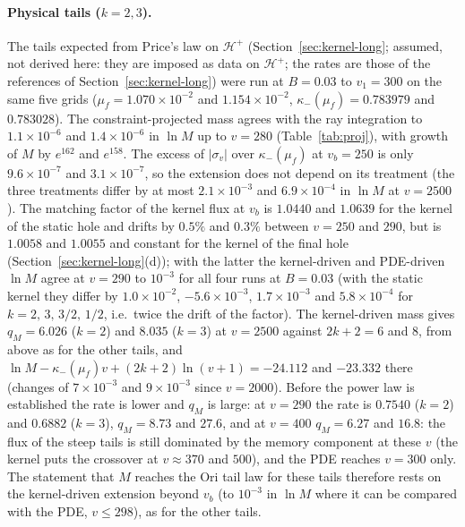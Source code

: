 \documentclass[11pt]{article}
\begin{document}
\paragraph{Physical tails ($k=2,3$).} The tails expected from Price's law on $\mathcal H^+$ (Section~\ref{sec:kernel-long}; assumed, not derived here: they are imposed as data on $\mathcal H^+$; the rates are those of the references of Section~\ref{sec:kernel-long}) were run at $B=0.03$ to $v_1=300$ on the same five grids ($\mu_f=1.070\times10^{-2}$ and $1.154\times10^{-2}$, $\kappa_-(\mu_f)=0.783979$ and $0.783028$). The constraint-projected mass agrees with the ray integration to $1.1\times10^{-6}$ and $1.4\times10^{-6}$ in $\ln M$ up to $v=280$ (Table~\ref{tab:proj}), with growth of $M$ by $e^{162}$ and $e^{158}$. The excess of $|\sigma_v|$ over $\kappa_-(\mu_f)$ at $v_b=250$ is only $9.6\times10^{-7}$ and $3.1\times10^{-7}$, so the extension does not depend on its treatment (the three treatments differ by at most $2.1\times10^{-3}$ and $6.9\times10^{-4}$ in $\ln M$ at $v=2500$). The matching factor of the kernel flux at $v_b$ is $1.0440$ and $1.0639$ for the kernel of the static hole and drifts by $0.5\%$ and $0.3\%$ between $v=250$ and $290$, but is $1.0058$ and $1.0055$ and constant for the kernel of the final hole (Section~\ref{sec:kernel-long}(d)); with the latter the kernel-driven and PDE-driven $\ln M$ agree at $v=290$ to $10^{-3}$ for all four runs at $B=0.03$ (with the static kernel they differ by $1.0\times10^{-2}$, $-5.6\times10^{-3}$, $1.7\times10^{-3}$ and $5.8\times10^{-4}$ for $k=2,\,3,\,3/2,\,1/2$, i.e.\ twice the drift of the factor). The kernel-driven mass gives $q_M=6.026$ ($k=2$) and $8.035$ ($k=3$) at $v=2500$ against $2k+2=6$ and $8$, from above as for the other tails, and $\ln M-\kappa_-(\mu_f)v+(2k+2)\ln(v+1)=-24.112$ and $-23.332$ there (changes of $7\times10^{-3}$ and $9\times10^{-3}$ since $v=2000$). Before the power law is established the rate is lower and $q_M$ is large: at $v=290$ the rate is $0.7540$ ($k=2$) and $0.6882$ ($k=3$), $q_M=8.73$ and $27.6$, and at $v=400$ $q_M=6.27$ and $16.8$: the flux of the steep tails is still dominated by the memory component at these $v$ (the kernel puts the crossover at $v\approx370$ and $500$), and the PDE reaches $v=300$ only. The statement that $M$ reaches the Ori tail law for these tails therefore rests on the kernel-driven extension beyond $v_b$ (to $10^{-3}$ in $\ln M$ where it can be compared with the PDE, $v\le298$), as for the other tails.
\end{document}
